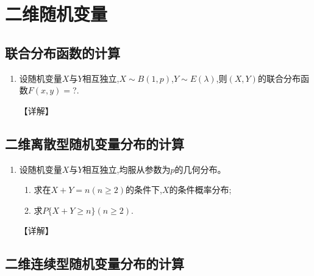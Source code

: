 \documentclass[12pt, a4paper, oneside, UTF8]{ctexbook}
\begin{document}
% 
\else
\fi
\chapter{二维随机变量}

\section{联合分布函数的计算}

\begin{enumerate}[label=\arabic*.]
    \item 设随机变量$X$与$Y$相互独立,$X\sim B(1,p)$,$Y\sim E(\lambda)$,则$(X,Y)$的联合分布函数$F(x,y)=$?.
    
    \begin{solution}
    【详解】
    \end{solution}
\end{enumerate}

\section{二维离散型随机变量分布的计算}

\begin{enumerate}[label=\arabic*.,start=2]
    \item 设随机变量$X$与$Y$相互独立,均服从参数为$p$的几何分布。
    \begin{enumerate}
        \item 求在$X+Y=n(n\geq 2)$的条件下,$X$的条件概率分布;
        \item 求$P\{X+Y\geq n\}(n\geq 2)$.
    \end{enumerate}
    
    \begin{solution}
    【详解】
    \end{solution}
\end{enumerate}

\section{二维连续型随机变量分布的计算}
\end{document}

